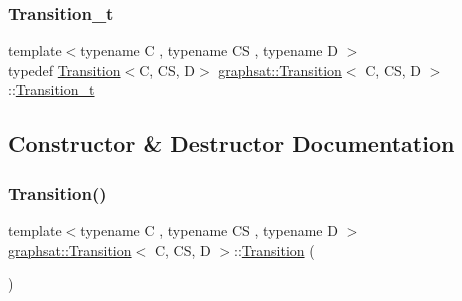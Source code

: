 \subsubsection{\texorpdfstring{Transition\_t}{Transition\_t}}
{\footnotesize\ttfamily template$<$typename C , typename CS , typename D $>$ \\
typedef \mbox{\hyperlink{classgraphsat_1_1_transition}{Transition}}$<$C, CS, D$>$ \mbox{\hyperlink{classgraphsat_1_1_transition}{graphsat\+::\+Transition}}$<$ C, CS, D $>$\+::\mbox{\hyperlink{classgraphsat_1_1_transition_ae0650c39cf272493d16d1fd1b01b6075}{Transition\+\_\+t}}\hspace{0.3cm}{\ttfamily [private]}}



\subsection{Constructor \& Destructor Documentation}
\mbox{\label{classgraphsat_1_1_transition_a66f3b9e8b9b5d2d941cf8daed7deb024}} 
\subsubsection{\texorpdfstring{Transition()}{Transition()}\hspace{0.1cm}{\footnotesize\ttfamily [1/3]}}
{\footnotesize\ttfamily template$<$typename C , typename CS , typename D $>$ \\
\mbox{\hyperlink{classgraphsat_1_1_transition}{graphsat\+::\+Transition}}$<$ C, CS, D $>$\+::\mbox{\hyperlink{classgraphsat_1_1_transition}{Transition}} (\begin{DoxyParamCaption}{ }\end{DoxyParamCaption})\hspace{0.3cm}{\ttfamily [inline]}}

\mbox{\label{classgraphsat_1_1_transition_a9e8a93ede40a53a52376f122297edf23}} 
